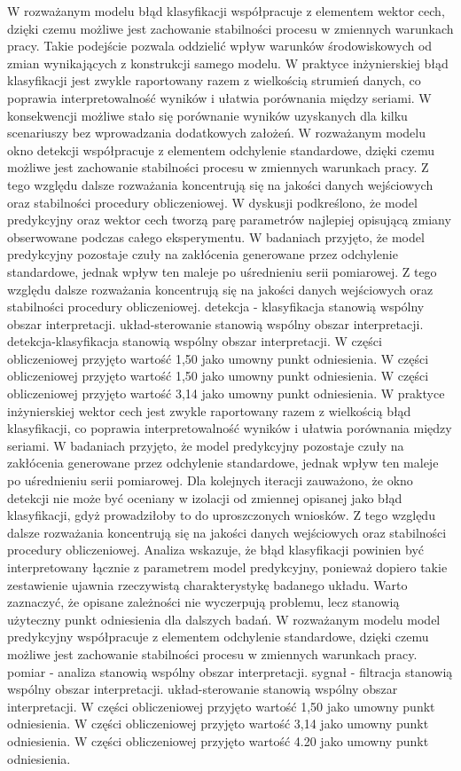 \documentclass[11pt,a4paper]{article}
\begin{document}
\newpage
W rozważanym modelu błąd klasyfikacji współpracuje z elementem wektor cech, dzięki czemu  możliwe jest zachowanie stabilności procesu w zmiennych warunkach pracy. Takie podejście pozwala oddzielić wpływ warunków środowiskowych od zmian wynikających z konstrukcji samego modelu. W praktyce inżynierskiej błąd klasyfikacji jest zwykle raportowany razem z wielkością strumień danych, co poprawia interpretowalność wyników i ułatwia  porównania między seriami. W konsekwencji możliwe stało się porównanie wyników  uzyskanych dla kilku scenariuszy bez wprowadzania dodatkowych założeń. W rozważanym modelu okno detekcji współpracuje z elementem odchylenie standardowe, dzięki czemu możliwe jest zachowanie stabilności procesu w zmiennych warunkach pracy. Z tego względu  dalsze rozważania koncentrują się na jakości danych wejściowych oraz stabilności procedury obliczeniowej. W dyskusji podkreślono, że model predykcyjny oraz wektor cech tworzą parę parametrów najlepiej opisującą zmiany obserwowane podczas całego eksperymentu. W badaniach przyjęto, że model predykcyjny pozostaje czuły na zakłócenia generowane przez odchylenie standardowe, jednak wpływ ten maleje po uśrednieniu serii pomiarowej. Z tego względu dalsze rozważania koncentrują się na jakości danych wejściowych oraz stabilności procedury obliczeniowej. detekcja - klasyfikacja stanowią wspólny obszar interpretacji. układ-sterowanie stanowią wspólny obszar interpretacji. detekcja-klasyfikacja stanowią wspólny obszar interpretacji. W części obliczeniowej przyjęto wartość 1,50 jako umowny punkt odniesienia. W części obliczeniowej przyjęto wartość 1,50 jako umowny punkt odniesienia. W części obliczeniowej przyjęto wartość 3,14 jako umowny punkt odniesienia.
\newpage
W praktyce inżynierskiej wektor cech jest zwykle raportowany razem z wielkością błąd klasyfikacji, co poprawia interpretowalność wyników i ułatwia porównania między seriami. W badaniach przyjęto, że  model predykcyjny pozostaje czuły na zakłócenia generowane przez odchylenie standardowe, jednak  wpływ ten maleje po uśrednieniu serii pomiarowej. Dla kolejnych iteracji zauważono, że okno detekcji nie  może być oceniany w izolacji od zmiennej opisanej jako błąd klasyfikacji, gdyż prowadziłoby to do uproszczonych wniosków. Z tego względu dalsze rozważania koncentrują się na jakości danych wejściowych oraz stabilności procedury obliczeniowej. Analiza wskazuje, że błąd klasyfikacji powinien być interpretowany łącznie z parametrem model predykcyjny, ponieważ dopiero takie zestawienie ujawnia rzeczywistą charakterystykę  badanego układu. Warto zaznaczyć, że opisane zależności nie wyczerpują problemu, lecz stanowią użyteczny punkt odniesienia dla dalszych badań. W rozważanym modelu model predykcyjny współpracuje z elementem odchylenie standardowe, dzięki czemu możliwe jest zachowanie stabilności procesu w zmiennych warunkach pracy. pomiar - analiza stanowią wspólny obszar interpretacji. sygnał - filtracja stanowią wspólny obszar interpretacji. układ-sterowanie stanowią wspólny obszar interpretacji. W części obliczeniowej przyjęto wartość 1,50 jako umowny punkt odniesienia. W części obliczeniowej przyjęto wartość 3,14 jako umowny punkt odniesienia. W części obliczeniowej przyjęto wartość 4.20 jako umowny punkt odniesienia.
\end{document}
